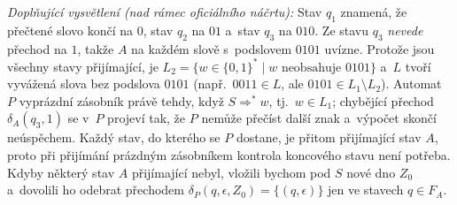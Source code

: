 \medskip
\noindent\textit{Doplňující vysvětlení (nad rámec oficiálního náčrtu):} Stav $q_1$
znamená, že přečtené slovo končí na $0$, stav $q_2$ na $01$ a~stav $q_3$ na $010$.
Ze stavu $q_3$ \emph{nevede} přechod na $1$, takže $A$ na každém slově s~podslovem
$0101$ uvízne. Protože jsou všechny stavy přijímající, je
$L_2 = \{w \in \{0,1\}^* \mid w \text{ neobsahuje } 0101\}$ a~$L$ tvoří vyvážená slova
bez podslova $0101$ (např.\ $0011 \in L$, ale $0101 \in L_1 \setminus L_2$).
Automat $P$ vyprázdní zásobník právě tehdy, když $S \Rightarrow^* w$, tj.\ $w \in L_1$;
chybějící přechod $\delta_A(q_3, 1)$ se v~$P$ projeví tak, že $P$ nemůže přečíst další
znak a~výpočet skončí neúspěchem. Každý stav, do kterého se $P$ dostane, je přitom
přijímající stav $A$, proto při přijímání prázdným zásobníkem kontrola koncového stavu
není potřeba. Kdyby některý stav $A$ přijímající nebyl, vložili bychom pod $S$ nové dno
$Z_0$ a~dovolili ho odebrat přechodem $\delta_P(q, \epsilon, Z_0) = \{(q, \epsilon)\}$
jen ve stavech $q \in F_A$.
